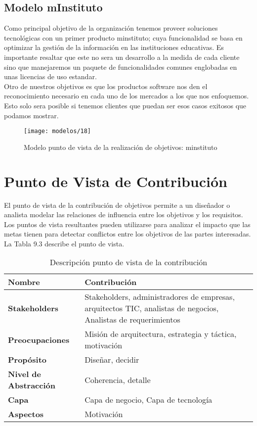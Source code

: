   \subsection{Modelo mInstituto}
   Como principal objetivo de la organización tenemos proveer soluciones tecnológicas con un primer producto minstituto; cuya funcionalidad se basa en optimizar la gestión de la información en las instituciones educativas. Es importante resaltar que este no sera un desarrollo a la medida de cada cliente sino que manejaremos un paquete de funcionalidades comunes englobadas en unas licencias de uso estandar. \\
   
   Otro de nuestros objetivos es que los productos software nos den el reconocimiento necesario en cada uno de los mercados a los que nos enfoquemos. Esto solo sera posible si tenemos clientes que puedan ser esos casos exitosos que podamos mostrar.

   \begin{figure}[H]
   	\centering
   	\texttt{[image: modelos/18]}
   	\captionsetup{width=.95\textwidth}
   	\caption{Modelo punto de vista de la realización de objetivos: minstituto}
   	\label{modelo18}
   \end{figure}
   
\section{Punto de Vista de Contribución}
El punto de vista de la contribución de objetivos permite a un diseñador o analista modelar las relaciones de influencia entre los objetivos y los requisitos. Los puntos de vista resultantes pueden utilizarse para analizar el impacto que las metas tienen para detectar conflictos entre los objetivos de las partes interesadas. La Tabla 9.3 describe el punto de vista.
   
   \begin{table}[H]
   	\centering
   	\begin{tabular}{lp{8cm}}
   		\toprule
   		\textbf{Nombre} & \textbf{Contribución} \\
   		\midrule
   		\textbf{Stakeholders} & Stakeholders, administradores de empresas, arquitectos TIC, analistas de negocios, Analistas de requerimientos \\
   		\textbf{Preocupaciones} &  Misión de arquitectura, estrategia y táctica, motivación \\
   		\textbf{Propósito} & Diseñar, decidir \\
   		\textbf{Nivel de Abstracción} & Coherencia, detalle \\
   		\textbf{Capa} & Capa de negocio, Capa de tecnología \\
   		\textbf{Aspectos} & Motivación \\
   		\bottomrule
   	\end{tabular}
   	\captionsetup{width=.95\textwidth}
   	\caption{Descripción punto de vista de la contribución}
   	\label{tabla22}
   \end{table}
   
